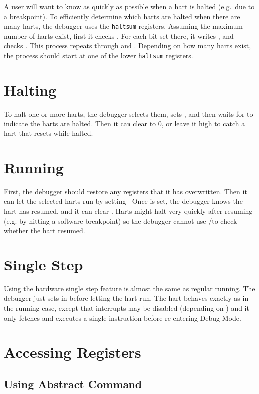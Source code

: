 A user will want to know as quickly as possible when a hart is halted (e.g.\ due
to a breakpoint).  To efficiently determine which harts are halted when there
are many harts, the debugger uses the {\tt haltsum} registers. Assuming the
maximum number of harts exist, first it checks \Rhaltsumthree. For each bit set
there, it writes \Fhartsel, and checks \Rhaltsumtwo. This process repeats
through \Rhaltsumone and \Rhaltsumzero. Depending on how many harts exist, the
process should start at one of the lower {\tt haltsum} registers.

\section{Halting} \label{deb:halt}

To halt one or more harts, the debugger selects them, sets \Fhaltreq, and then
waits for \Fallhalted to indicate the harts are halted. Then it can clear
\Fhaltreq to 0, or leave it high to catch a hart that resets while halted.

\section{Running}

First, the debugger should restore any registers that it has overwritten.
Then it can let the selected harts run by setting \Fresumereq. Once
\Fallresumeack is set, the debugger knows the hart has resumed, and it can
clear \Fresumereq. Harts might halt very quickly after resuming (e.g.
by hitting a software breakpoint) so the debugger cannot use
\Fallhalted/\Fanyhalted to check whether the hart resumed.

\section{Single Step}

Using the hardware single step feature is almost the same as regular running.
The debugger just sets \Fstep in \Rdcsr before letting the hart run. The hart
behaves exactly as in the running case, except that interrupts may be disabled
(depending on \Fstepie) and it only fetches and executes a single instruction
before re-entering Debug Mode.

\section{Accessing Registers}

\subsection{Using Abstract Command} \label{deb:abstractreg}


